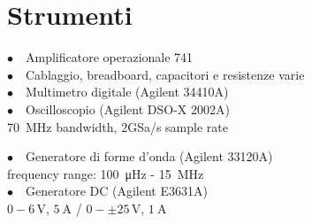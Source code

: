 
\section{Strumenti}
%
\noindent
\begin{minipage}{.5\linewidth}
$\bullet \quad$Amplificatore operazionale 741\\
$\bullet \quad$Cablaggio, breadboard, capacitori e resistenze varie\\
$\bullet \quad$Multimetro digitale (Agilent 34410A)\\
$\bullet \quad$Oscilloscopio (Agilent DSO-X 2002A)\\
\phantom{xxxx}\SI{70}{\mega\hertz} bandwidth, 2GSa/s sample rate\\
\end{minipage}%
\begin{minipage}{.5\linewidth}
$\bullet \quad$Generatore di forme d'onda (Agilent 33120A)\\
\phantom{xxxx}frequency range: \SI{100}{\micro\hertz} - \SI{15}{\mega\hertz}\\
$\bullet \quad$Generatore DC (Agilent E3631A)\\
\phantom{xxxx}$0-6\,\si{\volt}$, $\SI{5}{\ampere}$ / $0-\pm25\,\si{\volt}$, $\SI{1}{\ampere}$\\
\end{minipage}